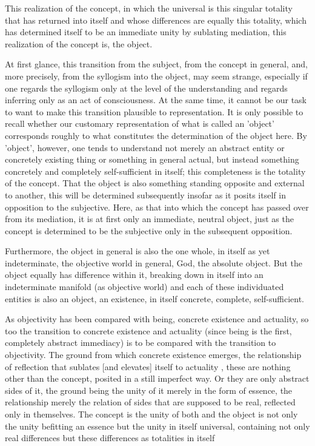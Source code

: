 This realization of the concept,
in which the universal is this singular totality
that has returned into itself
and whose differences are equally this totality,
which has determined itself to be
an immediate unity by sublating mediation,
this realization of the concept is, the object.

At first glance, this transition from the subject,
from the concept in general, and, more precisely,
from the syllogism into the object, may seem strange,
especially if one regards the syllogism
only at the level of the understanding
and regards inferring only as an act of consciousness.
At the same time, it cannot be our task to want
to make this transition plausible to representation.
It is only possible to recall whether our customary representation
of what is called an 'object' corresponds roughly to
what constitutes the determination of the object here.
By 'object', however, one tends to understand
not merely an abstract entity
or concretely existing thing
or something in general actual,
but instead something concretely and completely
self-sufficient in itself;
this completeness is the totality of the concept.
That the object is also something standing
opposite and external to another,
this will be determined subsequently insofar as
it posits itself in opposition to the subjective.
Here, as that into which the concept has
passed over from its mediation,
it is at first only an immediate, neutral object,
just as the concept is determined to be the subjective
only in the subsequent opposition.

Furthermore, the object in general is also
the one whole, in itself as yet indeterminate,
the objective world in general,
God, the absolute object.
But the object equally has difference within it,
breaking down in itself into
an indeterminate manifold (as objective world)
and each of these individuated entities is also an object,
an existence, in itself concrete, complete, self-sufficient.

As objectivity has been compared with being,
concrete existence and actuality,
so too the transition to concrete existence and actuality
(since being is the first, completely abstract immediacy)
is to be compared with the transition to objectivity.
The ground from which concrete existence emerges,
the relationship of reflection that
sublates [and elevates] itself to actuality ,
these are nothing other than the concept,
posited in a still imperfect way.
Or they are only abstract sides of it,
the ground being the unity of it merely in the form of essence,
the relationship merely the relation of sides
that are supposed to be real,
reflected only in themselves.
The concept is the unity of both
and the object is not only
the unity befitting an essence
but the unity in itself universal,
containing not only real differences
but these differences as totalities in itself


